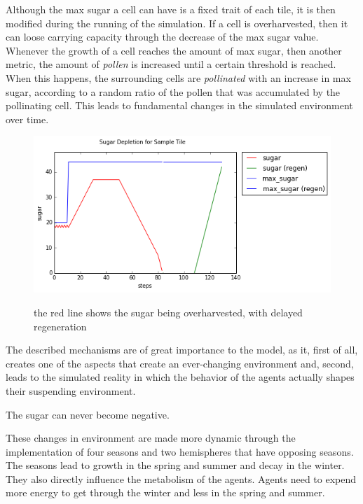 Although the max sugar a cell can have is a fixed trait of each tile, it is then modified during the running of the simulation. If a cell is overharvested, then it can loose carrying capacity through the decrease of the max sugar value. Whenever the growth of a cell reaches the amount of max sugar, then another metric, the amount of \textit{pollen} is increased until a certain threshold is reached. When this happens, the surrounding cells are \textit{pollinated} with an increase in max sugar, according to a random ratio of the pollen that was accumulated by the pollinating cell. This leads to fundamental changes in the simulated environment over time.

\begin{figure}[h]
\includegraphics[width=0.7\linewidth]{growth.png}
\begin{captionbelow}{the red line shows the sugar being overharvested, with delayed regeneration}\end{captionbelow}
\end{figure}

The described mechanisms are of great importance to the model, as it, first of all, creates one of the aspects that create an ever-changing environment and, second, leads to the simulated reality in which the behavior of the agents actually shapes their suspending environment. 

The sugar can never become negative.

These changes in environment are made more dynamic through the implementation of four seasons and two hemispheres that have opposing seasons. The seasons lead to growth in the spring and summer and decay in the winter. They also directly influence the metabolism of the agents. Agents need to expend more energy to get through the winter and less in the spring and summer.

